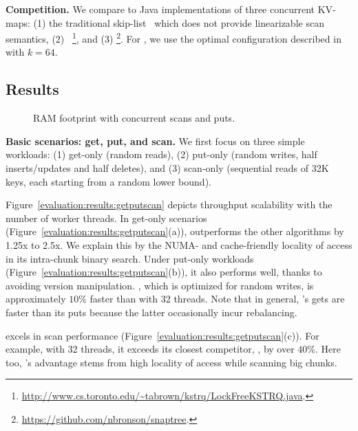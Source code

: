 \textbf{Competition.}
We compare {\kiwi} to Java implementations of three concurrent KV-maps: (1) the traditional 
skip-list~\cite{JavaConcurrentSkipList} which does not provide linearizable scan semantics, 
(2) {\kary}~\cite{BrownA12}\footnote{\small{\url{http://www.cs.toronto.edu/~tabrown/kstrq/LockFreeKSTRQ.java}}.}, 
and (3) {\snaptree}\cite{BronsonCCO2010}\footnote{\small{\url{https://github.com/nbronson/snaptree}}.}. 
For {\kary}, we use the optimal configuration described in~\cite{BrownA12} with $k=64$. 

\subsection{Results}


\begin{figure}
\begin{center}

\end{center}
\caption{RAM footprint with concurrent scans and puts. }
\label{evaluation:results:mem}
\end{figure}

\textbf{Basic scenarios: get, put, and scan.} 
We first focus on three simple workloads: 
(1) get-only (random reads), 
(2) put-only (random writes, half inserts/updates and half deletes), and 
(3) scan-only (sequential reads of 32K keys, each starting from a random lower bound).  

Figure~\ref{evaluation:results:getputscan} depicts throughput scalability with the number of worker threads. 
In get-only scenarios (Figure~\ref{evaluation:results:getputscan}(a)), {\kiwi} outperforms the other 
algorithms by 1.25x to 2.5x. We explain this by the NUMA- and cache-friendly locality of access in its intra-chunk binary search. 
Under put-only workloads (Figure~\ref{evaluation:results:getputscan}(b)), it also performs well, thanks to avoiding version
manipulation. {\snaptree}, which is optimized for random writes, is approximately $10\%$ faster than {\kiwi}
with 32 threads. Note that in general, {\kiwi}'s gets are faster than its puts because the latter occasionally incur rebalancing. 

{\kiwi} excels in scan performance (Figure~\ref{evaluation:results:getputscan}(c)). 
For example, with 32 threads, it exceeds its closest competitor, {\kary}, by over $40\%$. 
Here too, {\kiwi}'s advantage stems from high locality of access while scanning big chunks. 

